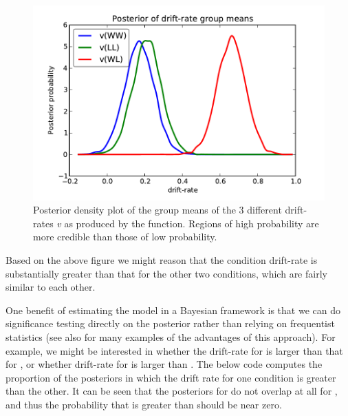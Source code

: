 \documentclass[letterpaper,10pt,english]{article}
\begin{document}
\begin{figure}
\includegraphics[scale=.7]{hddm_demo_fig_06.pdf}
\caption{Posterior density plot of the group means of the 3 different
drift-rates \emph{v} as produced by the
 function. Regions of high
probability are more credible than those of low probability.}
\label{fig.post_drift}
\end{figure}
Based on the above figure we might reason that the  condition
drift-rate is substantially greater than that for the other two
conditions, which are fairly similar to each other.

One benefit of estimating the model in a Bayesian framework is that we
can do significance testing directly on the posterior rather than
relying on frequentist statistics \citep{Lindley65} (see also
\citep{Kruschke10} for many examples of the advantages of this
approach). For example, we might be interested in whether the
drift-rate for  is larger than that for , or whether
drift-rate for  is larger than . The below code
computes the proportion of the posteriors in which the drift rate for
one condition is greater than the other. It can be seen that the
posteriors for  do not overlap at all for , and thus
the probability that  is greater than  should be
near zero.
\end{document}
